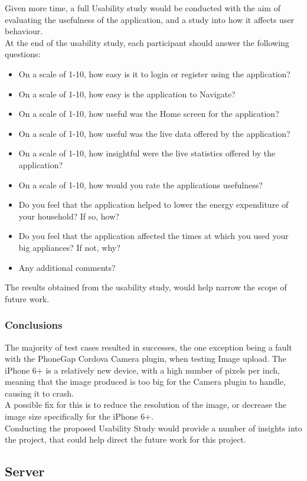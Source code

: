 \documentclass[preprint,12pt,3p]{elsarticle}
\begin{document}
Given more time, a full Usability study would be conducted with the aim of evaluating the usefulness of the application, and a study into how it affects user behaviour.\\
At the end of the usability study, each participant should answer the following questions:
\begin{itemize}
\item On a scale of 1-10, how easy is it to login or register using the application?
\item On a scale of 1-10, how easy is the application to Navigate?
\item On a scale of 1-10, how useful was the Home screen for the application?
\item On a scale of 1-10, how useful was the live data offered by the application?
\item On a scale of 1-10, how insightful were the live statistics offered by the application?
\item On a scale of 1-10, how would you rate the applications usefulness?
\item Do you feel that the application helped to lower the energy expenditure of your household? If so, how?
\item Do you feel that the application affected the times at which you used your big appliances? If not, why?
\item Any additional comments?
\end{itemize}
The results obtained from the usability study, would help narrow the scope of future work.

\subsubsection{Conclusions}
The majority of test cases resulted in successes, the one exception being a fault with the PhoneGap Cordova Camera plugin, when testing Image upload. The iPhone 6+ is a relatively new device, with a high number of pixels per inch, meaning that the image produced is too big for the Camera plugin to handle, causing it to crash.\\
A possible fix for this is to reduce the resolution of the image, or decrease the image size specifically for the iPhone 6+.\\
Conducting the proposed Usability Study would provide a number of insights into the project, that could help direct the future work for this project.

\clearpage
\subsection{Server}
\end{document}

